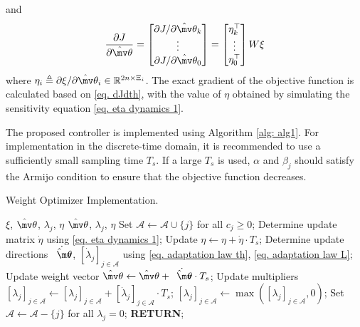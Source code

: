 \documentclass[lettersize,journal]{IEEEtran}
\newcommand*{\wth}{\mv\theta}
\begin{document}
and
\begin{equation}\label{eq. grad_J}
    {\partial J\over\partial\hat\wth}
    =
    \begin{bmatrix}
        \partial J/\partial\hat\wth_k\\\vdots\\\partial J/\partial\hat\wth_0\\
    \end{bmatrix}    =
    \begin{bmatrix}
        \eta_k^\top\\\vdots\\\eta_0^\top\\
    \end{bmatrix}
    W
    \xi
\end{equation}
where $\eta_i \triangleq \partial \xi/\partial \hat\wth_i\in\mathbb R^{2n\times \Xi_i}$. The exact gradient of the objective function is calculated based on \eqref{eq. dJdth}, with the value of $\eta$ obtained by simulating the sensitivity equation \eqref{eq. eta dynamics 1}.

The proposed controller is implemented using Algorithm \ref{alg: alg1}. For implementation in the discrete-time domain, it is recommended to use a sufficiently small sampling time $T_s$. If a large $T_s$ is used, $\alpha$ and $\beta_j$ should satisfy the Armijo condition \cite[Chap.~3 eq.~(3.4)]{RN22} to ensure that the objective function decreases.

\begin{algorithm}[!t]
    \caption{Weight Optimizer Implementation.}\label{alg: alg1}
    \begin{algorithmic}[1]
        \renewcommand{\algorithmicrequire}{\textbf{Input:}}
        \renewcommand{\algorithmicensure}{\textbf{Output:}}
        \REQUIRE $\xi$, $\hat\wth$, $\lambda_j$, $\eta$
        \ENSURE  $\hat\wth$, $\lambda_j$, $\eta$
        \STATE Set $\mathcal A \leftarrow \mathcal A\cup \{j\}$ for all $c_j\ge0$;
        \STATE Determine update matrix $\dot\eta$ using \eqref{eq. eta dynamics 1};
        \STATE Update $\eta\leftarrow \eta +\dot\eta\cdot T_s$; 
        \STATE Determine update directions $\dot{\hat\wth}$, $[\dot\lambda_j]_{j\in\mathcal A}$ using \eqref{eq. adaptation law th}, \eqref{eq. adaptation law L};
        \STATE Update weight vector $\hat\wth\leftarrow \hat\wth+\dot{\hat\wth}\cdot T_s$;
        \STATE Update multipliers $[\lambda_j]_{j\in\mathcal A}\leftarrow [\lambda_j]_{j\in\mathcal A}+[\dot\lambda_j]_{j\in\mathcal A}\cdot T_s$;
        \STATE $[\lambda_j]_{j\in\mathcal A}\leftarrow \max([\lambda_j]_{j\in\mathcal A}, 0)$;
        \STATE Set $\mathcal A \leftarrow \mathcal A - \{j\}$ for all $\lambda_j=0$;
        \STATE \textbf{RETURN};
    \end{algorithmic}
    \label{alg1}
\end{algorithm}
\end{document}
